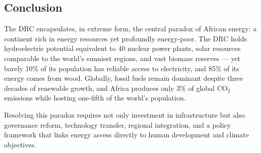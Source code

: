 \subsection{Conclusion}

The DRC encapsulates, in extreme form, the central paradox of African energy: a continent rich in energy resources yet profoundly energy-poor. The DRC holds hydroelectric potential equivalent to 40 nuclear power plants, solar resources comparable to the world's sunniest regions, and vast biomass reserves — yet barely 10\% of its population has reliable access to electricity, and 85\% of its energy comes from wood. Globally, fossil fuels remain dominant despite three decades of renewable growth, and Africa produces only 3\% of global CO$_2$ emissions while hosting one-fifth of the world's population.

Resolving this paradox requires not only investment in infrastructure but also governance reform, technology transfer, regional integration, and a policy framework that links energy access directly to human development and climate objectives.